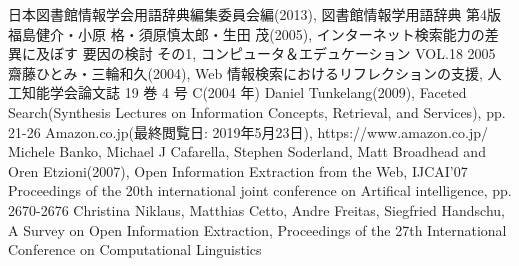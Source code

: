 \documentclass[a4j,10pt, twocolumn]{jarticle}
\begin{document}
\begin{thebibliography}{9}
  日本図書館情報学会用語辞典編集委員会編(2013), 図書館情報学用語辞典 第4版
   福島健介・小原 格・須原慎太郎・生田 茂(2005), インターネット検索能力の差異に及ぼす 要因の検討 その1, コンピュータ＆エデュケーション VOL.18 2005
   齋藤ひとみ・三輪和久(2004),  Web 情報検索におけるリフレクションの支援, 人工知能学会論文誌 19 巻 4 号 C(2004 年)
  Daniel Tunkelang(2009), Faceted Search(Synthesis Lectures on Information Concepts, Retrieval, and Services), pp. 21-26
  Amazon.co.jp(最終閲覧日: 2019年5月23日), https://www.amazon.co.jp/
  Michele Banko, Michael J Cafarella, Stephen Soderland, Matt Broadhead and Oren Etzioni(2007), Open Information Extraction from the Web, IJCAI'07 Proceedings of the 20th international joint conference on Artifical intelligence, pp. 2670-2676 
  Christina Niklaus, Matthias Cetto, Andre Freitas, Siegfried Handschu, A Survey on Open Information Extraction, Proceedings of the 27th International Conference on Computational Linguistics
\end{thebibliography}
\end{document}
